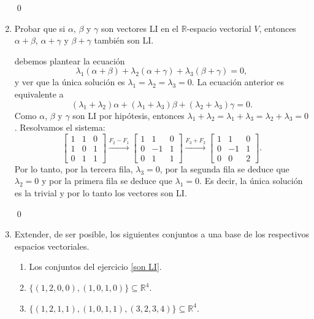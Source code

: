 \begin{enumerate}[resume, topsep=6pt, itemsep=.4cm]
    \qed     
    
    \item  Probar que si $\alpha$, $\beta$ y $\gamma$ son vectores LI en el $\mathbb{R}$-espacio vectorial $V$, entonces $\alpha +\beta$, $\alpha +\gamma$ y $\beta +\gamma $ también son LI.
    
    
    \rta debemos plantear la ecuación
    $$
    \lambda_1 (\alpha +\beta)+\lambda_2 (\alpha +\gamma)+\lambda_3 (\beta +\gamma)=0,
    $$
    y ver que la única solución es $\lambda_1=\lambda_2=\lambda_3=0$. La ecuación anterior es equivalente a 
    $$
    (\lambda_1+\lambda_2)\alpha+(\lambda_1+\lambda_3)\beta+(\lambda_2+\lambda_3)\gamma=0.
    $$  
    Como $\alpha$, $\beta$ y $\gamma$ son LI por hipótesis, entonces $\lambda_1+\lambda_2=\lambda_1+\lambda_3=\lambda_2+\lambda_3=0$. Resolvamos el sistema:
    $$
    \begin{bmatrix}
        1 & 1 & 0\\
        1 & 0 & 1\\
        0 & 1 & 1
    \end{bmatrix}
    \stackrel{F_2-F_1}{\longrightarrow}
    \begin{bmatrix}
        1 & 1 & 0\\
        0 & -1 & 1\\
        0 & 1 & 1
    \end{bmatrix}
    \stackrel{F_3+F_2}{\longrightarrow}
    \begin{bmatrix}
        1 & 1 & 0\\
        0 & -1 & 1\\
        0 & 0 & 2
    \end{bmatrix}.
    $$
    Por lo tanto, por la tercera fila, $\lambda_3=0$, por la segunda fila se deduce que $\lambda_2=0$ y por la primera fila se deduce que $\lambda_1=0$. Es decir, la única solución es la trivial y por lo tanto los vectores son LI.

    \qed     
    
    \item Extender, de ser posible, los siguientes conjuntos a una base de los respectivos espacios vectoriales.
    
    \begin{enumerate}
        \item\label{extender-a} Los conjuntos del ejercicio \ref{son LI}.
        \item\label{extender-b} $\{ (1,2,0,0),(1,0,1,0) \}\subseteq\mathbb{R}^4$.
        \item\label{extender-c} $\{ (1,2,1,1),(1,0,1,1),(3,2,3,4)\}\subseteq\mathbb{R}^4$.
    \end{enumerate}
    

\end{enumerate}
